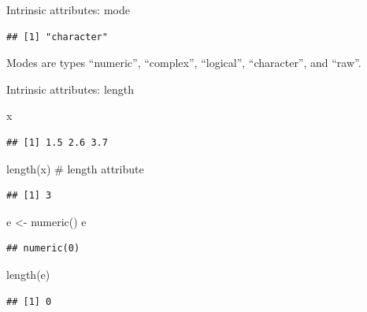 \documentclass[
  9pt,
  ignorenonframetext,
]{beamer}
\newenvironment{Shaded}{\begin{snugshade}}{\end{snugshade}}
\newcommand{\CommentTok}[1]{\textcolor[rgb]{0.50,0.62,0.50}{#1}}
\newcommand{\KeywordTok}[1]{\textcolor[rgb]{0.94,0.87,0.69}{#1}}
\newcommand{\NormalTok}[1]{\textcolor[rgb]{0.80,0.80,0.80}{#1}}
\newcommand{\StringTok}[1]{\textcolor[rgb]{0.80,0.58,0.58}{#1}}
\begin{document}
\begin{frame}[fragile]{Intrinsic attributes: mode}
\begin{verbatim}
## [1] "character"
\end{verbatim}

\vfill

\begin{block}{}
\protect\hypertarget{section}{}
Modes are types ``numeric'', ``complex'', ``logical'', ``character'',
and ``raw''.
\end{block}
\end{frame}

\begin{frame}[fragile]{Intrinsic attributes: length}
\protect\hypertarget{intrinsic-attributes-length}{}
\footnotesize

\begin{Shaded}
\begin{Highlighting}[]
\NormalTok{x}
\end{Highlighting}
\end{Shaded}

\begin{verbatim}
## [1] 1.5 2.6 3.7
\end{verbatim}

\begin{Shaded}
\begin{Highlighting}[]
\KeywordTok{length}\NormalTok{(x)   }\CommentTok{\# length attribute}
\end{Highlighting}
\end{Shaded}

\begin{verbatim}
## [1] 3
\end{verbatim}

\begin{Shaded}
\begin{Highlighting}[]
\NormalTok{e \textless{}{-}}\StringTok{ }\KeywordTok{numeric}\NormalTok{()}
\NormalTok{e}
\end{Highlighting}
\end{Shaded}

\begin{verbatim}
## numeric(0)
\end{verbatim}

\begin{Shaded}
\begin{Highlighting}[]
\KeywordTok{length}\NormalTok{(e)}
\end{Highlighting}
\end{Shaded}

\begin{verbatim}
## [1] 0
\end{verbatim}


\end{frame}
\end{document}
